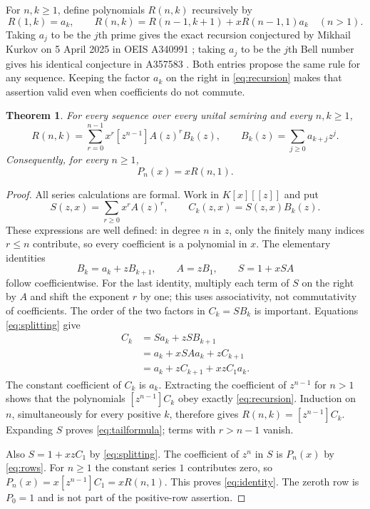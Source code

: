 \documentclass[11pt]{article}
\newtheorem{theorem}{Theorem}
\begin{document}
For $n,k\geq1$, define polynomials $R(n,k)$ recursively by
\begin{equation}\label{eq:recursion}
 R(1,k)=a_k,\qquad
 R(n,k)=R(n-1,k+1)+xR(n-1,1)a_k\quad(n>1).
\end{equation}
Taking $a_j$ to be the $j$th prime gives the exact recursion conjectured by
Mikhail Kurkov on 5 April 2025 in OEIS A340991 \cite{a340991}; taking $a_j$
to be the $j$th Bell number gives his identical conjecture in A357583
\cite{bell}. Both entries propose the same rule for any sequence. Keeping
the factor $a_k$ on the right in \eqref{eq:recursion} makes that assertion
valid even when coefficients do not commute.

\begin{theorem}\label{thm:main}
For every sequence over every unital semiring and every $n,k\geq1$,
\begin{equation}\label{eq:tailformula}
 R(n,k)=\sum_{r=0}^{n-1}x^r[z^{n-1}]A(z)^rB_k(z),
 \qquad B_k(z)=\sum_{j\geq0}a_{k+j}z^j.
\end{equation}
Consequently, for every $n\geq1$,
\begin{equation}\label{eq:identity}
 P_n(x)=xR(n,1).
\end{equation}
\end{theorem}

\begin{proof}
All series calculations are formal. Work in $K[x][[z]]$ and put
\[
 S(z,x)=\sum_{r\geq0}x^rA(z)^r,\qquad C_k(z,x)=S(z,x)B_k(z).
\]
These expressions are well defined: in degree $n$ in $z$, only the
finitely many indices $r\leq n$ contribute, so every coefficient is a
polynomial in $x$. The elementary identities
\begin{equation}\label{eq:splitting}
 B_k=a_k+zB_{k+1},\qquad A=zB_1,\qquad S=1+xSA
\end{equation}
follow coefficientwise. For the last identity, multiply each term of
$S$ on the right by $A$ and shift the exponent $r$ by one; this uses
associativity, not commutativity of coefficients. The order of the two
factors in $C_k=SB_k$ is important. Equations \eqref{eq:splitting} give
\begin{align*}
 C_k
 &=Sa_k+zSB_{k+1}\\
 &=a_k+xSAa_k+zC_{k+1}\\
 &=a_k+zC_{k+1}+xzC_1a_k.
\end{align*}
The constant coefficient of $C_k$ is $a_k$. Extracting the coefficient
of $z^{n-1}$ for $n>1$ shows that the polynomials
$[z^{n-1}]C_k$ obey exactly \eqref{eq:recursion}. Induction on $n$,
simultaneously for every positive $k$, therefore gives
$R(n,k)=[z^{n-1}]C_k$. Expanding $S$ proves
\eqref{eq:tailformula}; terms with $r>n-1$ vanish.

Also $S=1+xzC_1$ by \eqref{eq:splitting}. The coefficient of $z^n$ in
$S$ is $P_n(x)$ by \eqref{eq:rows}. For $n\geq1$ the constant series
$1$ contributes zero, so $P_n(x)=x[z^{n-1}]C_1=xR(n,1)$.
This proves \eqref{eq:identity}. The zeroth row is $P_0=1$ and is not
part of the positive-row assertion.
\end{proof}
\end{document}
